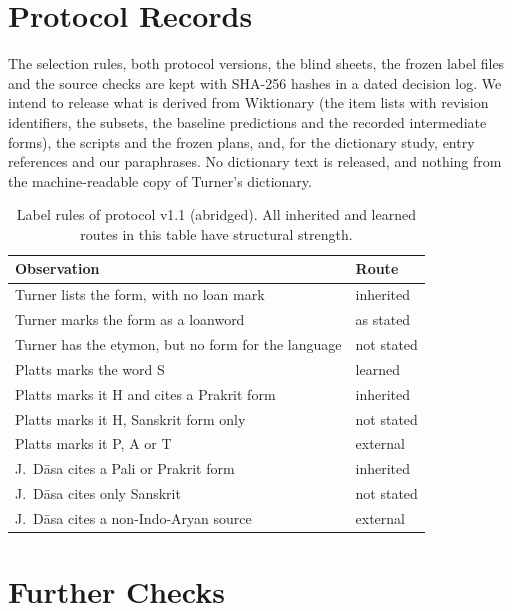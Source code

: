 \documentclass[11pt]{article}
\begin{document}


\appendix

\section{Protocol Records}
\label{app:records}

The selection rules, both protocol versions, the blind sheets, the frozen label files and the source checks are kept with SHA-256 hashes in a dated decision log. We intend to release what is derived from Wiktionary (the item lists with revision identifiers, the subsets, the baseline predictions and the recorded intermediate forms), the scripts and the frozen plans, and, for the dictionary study, entry references and our paraphrases. No dictionary text is released, and nothing from the machine-readable copy of Turner's dictionary.

\begin{table}[h]
\centering\small
\begin{tabular}{p{}p{}}
\toprule
\textbf{Observation} & \textbf{Route} \\
\midrule
Turner lists the form, with no loan mark & inherited \\
Turner marks the form as a loanword & as stated \\
Turner has the etymon, but no form for the language & not stated \\
Platts marks the word S & learned \\
Platts marks it H and cites a Prakrit form & inherited \\
Platts marks it H, Sanskrit form only & not stated \\
Platts marks it P, A or T & external \\
J.~D\=asa cites a Pali or Prakrit form & inherited \\
J.~D\=asa cites only Sanskrit & not stated \\
J.~D\=asa cites a non-Indo-Aryan source & external \\
\bottomrule
\end{tabular}
\caption{Label rules of protocol v1.1 (abridged). All inherited and learned routes in this table have structural strength.}
\label{tab:rules}
\end{table}

\section{Further Checks}
\label{app:further}
\end{document}
